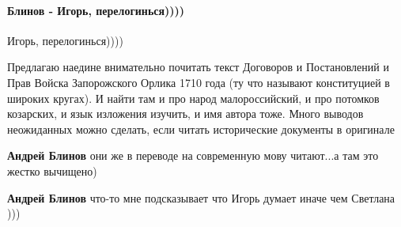  
 
 
 
 
\paragraph{Блинов - Игорь, перелогинься))))}

\begin{itemize}
 

Игорь, перелогинься))))

Предлагаю наедине внимательно почитать текст Договоров и Постановлений и Прав
Войска Запорожского Орлика 1710 года (ту что называют конституцией в широких
кругах). И найти там и про народ малороссийский, и про потомков козарских, и
язык изложения изучить, и имя автора тоже. Много выводов неожиданных можно
сделать, если читать исторические документы в оригинале

\begin{itemize}
 
\textbf{Андрей Блинов} они же в переводе на современную мову читают...а там это жестко вычищено)

 
\textbf{Андрей Блинов} что-то мне подсказывает что Игорь думает иначе чем Светлана )))

 

\end{itemize}
\end{itemize}
